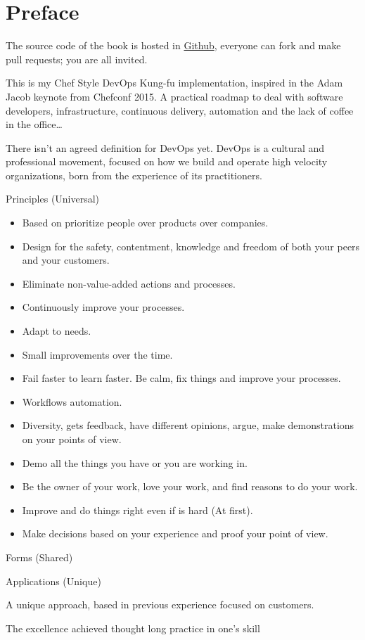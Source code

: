 \chapter{Preface}

The source code of the book is hosted in \href{https://github.com/carlosdcg/chefbyexample_book}{Github},
everyone can fork and make pull requests; you are all invited.

This is my Chef Style DevOps Kung-fu implementation, inspired
in the Adam Jacob keynote from Chefconf 2015. A practical
roadmap to deal with software developers, infrastructure,
continuous delivery, automation and the lack of coffee in the office\ldots{}

There isn’t an agreed definition for DevOps yet.
DevOps is a cultural and professional movement, focused on
how we build and operate high velocity organizations, born
from the experience of its practitioners.

Principles (Universal)

\begin{itemize}
\item Based on prioritize people over products over companies.
\item Design for the safety, contentment, knowledge and freedom of both your peers and your customers.
\item Eliminate non-value-added actions and processes.
\item Continuously improve your processes.
\item Adapt to needs.
\item Small improvements over the time.
\item Fail faster to learn faster. Be calm, fix things and improve your processes.
\item Workflows automation.
\item Diversity, gets feedback, have different opinions, argue, make demonstrations on your points of view.
\item Demo all the things you have or you are working in.
\item Be the owner of your work, love your work, and find reasons to do your work.
\item Improve and do things right even if is hard (At first).
\item Make decisions based on your experience and proof your point of view.
\end{itemize}

Forms (Shared)

Applications (Unique)

A unique approach, based in previous experience focused on customers.

The excellence achieved thought long practice in one’s skill